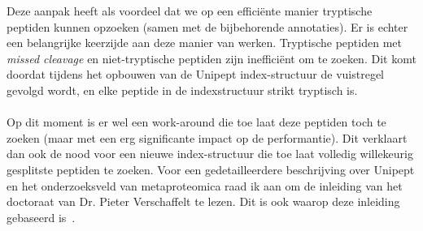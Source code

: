 \documentclass[11pt,dutch,faculty=we,layout=titlefont,underline=false,titleUppercase=true,titleUnderline=true]{ugent2016-report}
\begin{document}
    Deze aanpak heeft als voordeel dat we op een efficiënte manier tryptische peptiden kunnen opzoeken (samen met de bijbehorende annotaties).
    Er is echter een belangrijke keerzijde aan deze manier van werken.
    Tryptische peptiden met \textit{missed cleavage} en niet-tryptische peptiden zijn inefficiënt om te zoeken.
    Dit komt doordat tijdens het opbouwen van de Unipept index-structuur de vuistregel gevolgd wordt, en elke peptide in de indexstructuur strikt tryptisch is.
    \\ \\
    Op dit moment is er wel een work-around die toe laat deze peptiden toch te zoeken (maar met een erg significante impact op de performantie).
    Dit verklaart dan ook de nood voor een nieuwe index-structuur die toe laat volledig willekeurig gesplitste peptiden te zoeken.
    \newline
    Voor een gedetailleerdere beschrijving over Unipept en het onderzoeksveld van metaproteomica raad ik aan om de inleiding van het doctoraat van Dr. Pieter Verschaffelt te lezen.
    Dit is ook waarop deze inleiding gebaseerd is~\cite{phdPieterUnipept}.
\end{document}
